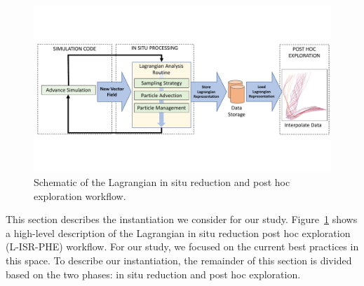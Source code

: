 \begin{figure}[!t]
\centering
\includegraphics[width=0.9\linewidth,trim={0cm 4.3cm 0cm 4.3cm}, clip ]{Images/Schematic.pdf}
\vspace{-2mm}
\caption{Schematic of the Lagrangian in situ reduction and post hoc exploration workflow.} %
\vspace{-5mm}
\label{fig:schematic}
\end{figure}

%

This section describes the instantiation we consider for our study.
%
Figure~\ref{fig:schematic} shows a high-level description of the Lagrangian in situ reduction post hoc exploration (L-ISR-PHE) workflow. 
%
%
For our study, we focused on the current best practices in this space.
%
To describe our instantiation, the remainder of this section is divided based on the two phases: in situ reduction and post hoc exploration. 
%

